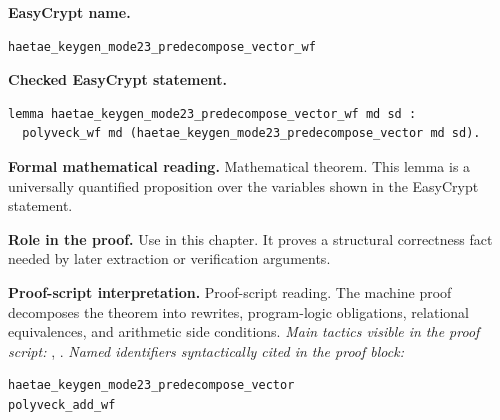 \begin{formaltheorem}
\noindent\textbf{EasyCrypt name.}
\begin{lstlisting}[language=EasyCrypt,basicstyle=\ttfamily\scriptsize]
haetae_keygen_mode23_predecompose_vector_wf
\end{lstlisting}
\noindent\textbf{Checked EasyCrypt statement.}
\begin{lstlisting}[language=EasyCrypt,basicstyle=\ttfamily\scriptsize]
lemma haetae_keygen_mode23_predecompose_vector_wf md sd :
  polyveck_wf md (haetae_keygen_mode23_predecompose_vector md sd).
\end{lstlisting}
\noindent\textbf{Formal mathematical reading.}
Mathematical theorem. This lemma is a universally quantified proposition over the variables shown in the EasyCrypt statement.

\noindent\textbf{Role in the proof.}
Use in this chapter. It proves a structural correctness fact needed by later extraction or verification arguments.

\noindent\textbf{Proof-script interpretation.}
Proof-script reading. The machine proof decomposes the theorem into rewrites, program-logic obligations, relational equivalences, and arithmetic side conditions.
\emph{Main tactics visible in the proof script:} , .
\emph{Named identifiers syntactically cited in the proof block:}
\begin{lstlisting}[language=EasyCrypt,basicstyle=\ttfamily\scriptsize]
haetae_keygen_mode23_predecompose_vector
polyveck_add_wf
\end{lstlisting}

\end{formaltheorem}

